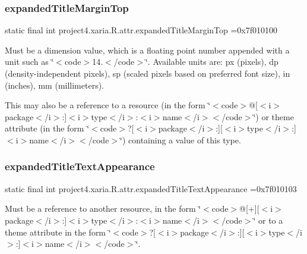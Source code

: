 \subsubsection{\texorpdfstring{expanded\+Title\+Margin\+Top}{expandedTitleMarginTop}}
{\footnotesize\ttfamily static final int project4.\+xaria.\+R.\+attr.\+expanded\+Title\+Margin\+Top =0x7f010100\hspace{0.3cm}{\ttfamily [static]}}

Must be a dimension value, which is a floating point number appended with a unit such as \char`\"{}$<$code$>$14.\+5sp$<$/code$>$\char`\"{}. Available units are\+: px (pixels), dp (density-\/independent pixels), sp (scaled pixels based on preferred font size), in (inches), mm (millimeters). 

This may also be a reference to a resource (in the form \char`\"{}$<$code$>$@\mbox{[}$<$i$>$package$<$/i$>$\+:\mbox{]}$<$i$>$type$<$/i$>$\+:$<$i$>$name$<$/i$>$$<$/code$>$\char`\"{}) or theme attribute (in the form \char`\"{}$<$code$>$?\mbox{[}$<$i$>$package$<$/i$>$\+:\mbox{]}\mbox{[}$<$i$>$type$<$/i$>$\+:\mbox{]}$<$i$>$name$<$/i$>$$<$/code$>$\char`\"{}) containing a value of this type. \mbox{\label{classproject4_1_1xaria_1_1R_1_1attr_abc26d944fa4d9a308d420006b5354bbf}} 
\subsubsection{\texorpdfstring{expanded\+Title\+Text\+Appearance}{expandedTitleTextAppearance}}
{\footnotesize\ttfamily static final int project4.\+xaria.\+R.\+attr.\+expanded\+Title\+Text\+Appearance =0x7f010103\hspace{0.3cm}{\ttfamily [static]}}

Must be a reference to another resource, in the form \char`\"{}$<$code$>$@\mbox{[}+\mbox{]}\mbox{[}$<$i$>$package$<$/i$>$\+:\mbox{]}$<$i$>$type$<$/i$>$\+:$<$i$>$name$<$/i$>$$<$/code$>$\char`\"{} or to a theme attribute in the form \char`\"{}$<$code$>$?\mbox{[}$<$i$>$package$<$/i$>$\+:\mbox{]}\mbox{[}$<$i$>$type$<$/i$>$\+:\mbox{]}$<$i$>$name$<$/i$>$$<$/code$>$\char`\"{}. \mbox{\label{classproject4_1_1xaria_1_1R_1_1attr_ad43d16336ef0ff15f16f41327deb86cf}} 
